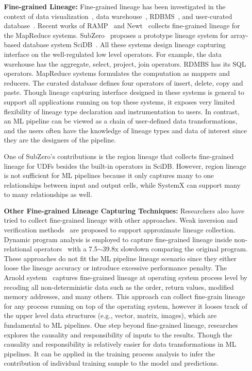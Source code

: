 \documentclass{sig-alternate}
\begin{document}
{\bf Fine-grained Lineage:} Fine-grained lineage has been investigated in the context of data visualization~\cite{stonebraker93, woodruff97},  
data warehouse~\cite{cui00, cui03}, RDBMS~\cite{widom04}, and user-curated database~\cite{buneman06}.
Recent works of RAMP~\cite{ikeda11, park11} and Newt~\cite{logothetis13} collects fine-grained lineage for the MapReduce
systems. SubZero~\cite{wu13} proposes a prototype lineage system for array-based database system SciDB~\cite{brown10}.
All these systems design lineage capturing interface on the well-regulated low level operators.
For example, the data warehouse has the aggregate, select, project, join operators. 
RDMBS has its SQL operators. MapReduce systems formulates the computation as mappers and reducers.
The curated database defines four operators of insert, delete, copy and paste.
Though lineage capturing interface designed in these systems is general to support all applications running on top these systems,
it exposes very limited flexibility of lineage type declaration and instrumentation to users.
In contrast, an ML pipeline can be viewed as a chain of user-defined data transformations, and the users often have the knowledge 
of lineage types and data of interest since they are the designers of the pipeline. 

One of SubZero's contributions is the region lineage that collects fine-grained lineage for UDFs besides the built-in operators in SciDB. 
However, region lineage is not sufficient for ML pipelines because it only captures many to one relationships between input and output cells, 
while SystemX can support many to many relationships as well.

{\bf Other Fine-grained Lineage Capturing Techniques:} Researchers also have tried to collect fine-grained lineage with other approaches.
Weak inversion and verification methods~\cite{woodruff97} are proposed to support approximate lineage collection.
Dynamic program analysis is employed to capture fine-grained lineage inside non-relational operators~\cite{zhang07} with 
a 7.5$\sim$39.8x slowdown comparing the original program. 
These approaches do not fit the ML pipeline lineage scenario since they either loose the lineage accuracy or introduce
excessive performance penalty.
The Arnold system~\cite{devecsery14} captures fine-grained lineage at operating system process level by recoding
all non-deterministic data such as the order, return values, modified memory addresses, and many others. 
This approach can collect fine-grain lineage for any process running on top of the operating system, however
it looses track of the upper level data structures (e.g., vector, matrix, images), which are fundamental to ML pipelines.
One step beyond fine-grained lineage, researches~\cite{meliou10, meliou11} explores the causality and responsibility
of inputs to the results. Though the causality and responsibility is relatively easier for data transformations in ML pipelines.
It can be applied in the training process analysis to infer the contribution of individual training sample to the model and predictions.
\end{document}
